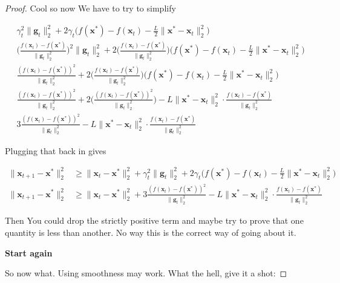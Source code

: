 \documentclass{article}
\begin{document}
\begin{proof}
	Cool so now We have to try to simplify
	
	\begin{align}
		&\gamma_t^2\| \mathbf{g}_t\|^2_2 + 2\gamma_t \big(f(\mathbf{x}^*)- f(\mathbf{x}_t)   - \frac{L}{2}\|\mathbf{x}^*-\mathbf{x}_t\|^2_2 \big)\\
		&\bigg(\frac{f(\mathbf{x}_t) - f(\mathbf{x}^*)}{\|\mathbf{g}_t\|^2_2} \bigg)^2\| \mathbf{g}_t\|^2_2 + 2\bigg(\frac{f(\mathbf{x}_t) - f(\mathbf{x}^*)}{\|\mathbf{g}_t\|^2_2} \bigg) \big(f(\mathbf{x}^*)- f(\mathbf{x}_t)   - \frac{L}{2}\|\mathbf{x}^*-\mathbf{x}_t\|^2_2 \big)\\
		&\frac{(f(\mathbf{x}_t) - f(\mathbf{x}^*))^2}{\|\mathbf{g}_t\|^2_2}  + 2\bigg(\frac{f(\mathbf{x}_t) - f(\mathbf{x}^*)}{\|\mathbf{g}_t\|^2_2} \bigg) \big(f(\mathbf{x}^*)- f(\mathbf{x}_t)   - \frac{L}{2}\|\mathbf{x}^*-\mathbf{x}_t\|^2_2 \big)\\
		&\frac{(f(\mathbf{x}_t) - f(\mathbf{x}^*))^2}{\|\mathbf{g}_t\|^2_2}  + 2\bigg(\frac{(f(\mathbf{x}_t) - f(\mathbf{x}^*))^2}{\|\mathbf{g}_t\|^2_2} \bigg)   - L\|\mathbf{x}^*-\mathbf{x}_t\|^2_2 \cdot \frac{f(\mathbf{x}_t) - f(\mathbf{x}^*)}{\|\mathbf{g}_t\|^2_2}\\
		&3\frac{(f(\mathbf{x}_t) - f(\mathbf{x}^*))^2}{\|\mathbf{g}_t\|^2_2}    - L\|\mathbf{x}^*-\mathbf{x}_t\|^2_2 \cdot \frac{f(\mathbf{x}_t) - f(\mathbf{x}^*)}{\|\mathbf{g}_t\|^2_2}
	\end{align}
	
	Plugging that back in gives 
		
	\begin{align}
		\| \mathbf{x}_{t+1} - \mathbf{x}^*\|^2_2  &\ge \|\mathbf{x}_t-\mathbf{x}^*\|^2_2 + \gamma_t^2\| \mathbf{g}_t\|^2_2 + 2\gamma_t \big(f(\mathbf{x}^*)- f(\mathbf{x}_t)   - \frac{L}{2}\|\mathbf{x}^*-\mathbf{x}_t\|^2_2 \big)\\
		\| \mathbf{x}_{t+1} - \mathbf{x}^*\|^2_2  &\ge \|\mathbf{x}_t-\mathbf{x}^*\|^2_2 + 3\frac{(f(\mathbf{x}_t) - f(\mathbf{x}^*))^2}{\|\mathbf{g}_t\|^2_2}    - L\|\mathbf{x}^*-\mathbf{x}_t\|^2_2 \cdot \frac{f(\mathbf{x}_t) - f(\mathbf{x}^*)}{\|\mathbf{g}_t\|^2_2}
	\end{align}
	
	Then You could drop the strictly positive term and maybe try to prove that one quantity is less than another. No way this is the correct way of going about it. 
	
	\textbf{Start again}
	
	So now what. Using smoothness may work. What the hell, give it a shot:
	

\end{proof}
\end{document}
